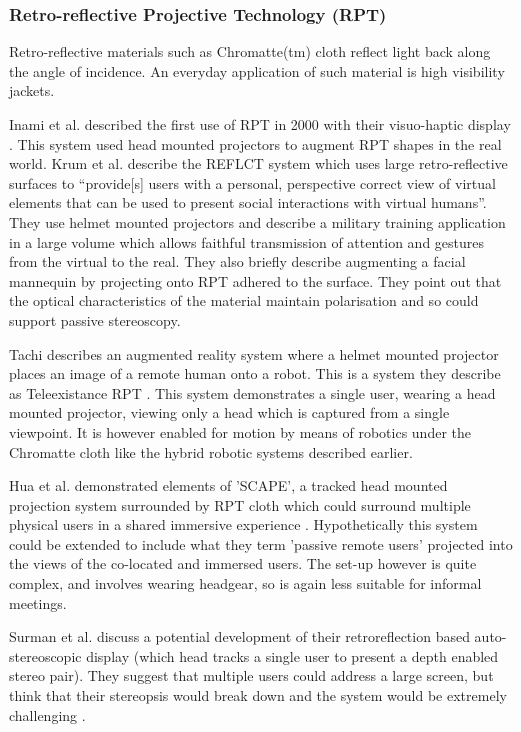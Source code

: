             \subsubsection{Retro-reflective Projective Technology (RPT)}
Retro-reflective materials such as Chromatte(tm) cloth reflect light back along the angle of incidence. An everyday application of such material is high visibility jackets.\par
Inami et al. described the first use of RPT in 2000 with their visuo-haptic display \cite{inami2000visuo}. This system used head mounted projectors to augment RPT shapes in the real world. Krum et al. describe the REFLCT system \cite{Krum2012} which uses large retro-reflective surfaces to ``provide[s] users with a personal, perspective correct view of virtual elements that can be used to present social interactions with virtual humans''. They use helmet mounted projectors and describe a military training application in a large volume which allows faithful transmission of attention and gestures from the virtual to the real. They also briefly describe augmenting a facial mannequin by projecting onto RPT adhered to the surface. They point out that the optical characteristics of the material maintain polarisation and so could support passive stereoscopy.\par
Tachi describes an augmented reality system where a helmet mounted projector  places an image of a remote human onto a robot. This is a system they describe as Teleexistance RPT \cite{Tachi2003, Tachi2004}. This system demonstrates a single user, wearing a head mounted projector, viewing only a head which is captured from a single viewpoint. It is however enabled for motion by means of robotics under the Chromatte cloth like the hybrid robotic systems described earlier.\par
Hua et al. demonstrated elements of 'SCAPE', a tracked head mounted projection system surrounded by RPT cloth which could surround multiple physical users in a shared immersive experience \cite{Hua2004}. Hypothetically this system could be extended to include what they term 'passive remote users' projected into the views of the co-located and immersed users. The set-up however is quite complex, and involves wearing headgear, so is again less suitable for informal meetings.\par
Surman et al. discuss a potential development of their retroreflection based auto-stereoscopic display (which head tracks a single user to present a depth enabled stereo pair). They suggest that multiple users could address a large screen, but think that their stereopsis would break down and the system would be extremely challenging \cite{JSID:JSID295}.\par
